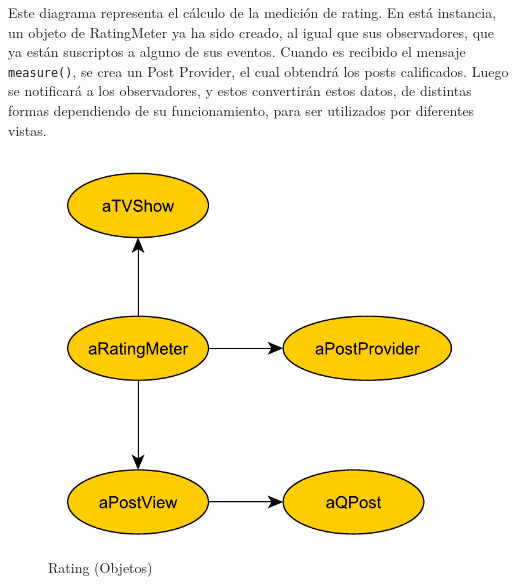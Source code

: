 Este diagrama representa el cálculo de la medición de rating. En está instancia, un objeto de RatingMeter ya ha sido creado, al igual que sus observadores, que ya están suscriptos a alguno de sus eventos. Cuando es recibido el mensaje \texttt{measure()}, se crea un Post Provider, el cual obtendrá los posts calificados. Luego se notificará a los observadores, y estos convertirán estos datos, de distintas formas dependiendo de su funcionamiento, para ser utilizados por diferentes vistas.

\begin{figure}[H]
\centering
\includegraphics[scale=0.7]{graph/objetos/Rating.pdf}
\caption{Rating (Objetos)}
\end{figure}
